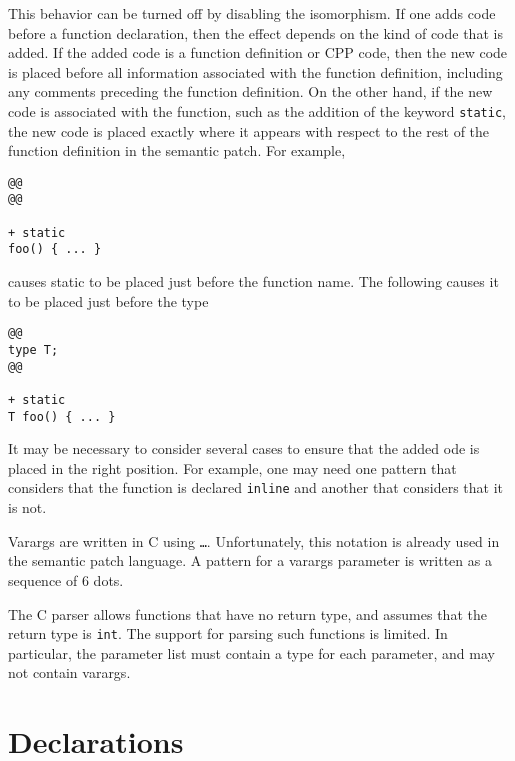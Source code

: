 \noindent
This behavior can be turned off by disabling the 
isomorphism.  If one adds code before a function declaration, then the
effect depends on the kind of code that is added.  If the added code is a
function definition or CPP code, then the new code is placed before
all information associated with the function definition, including any
comments preceding the function definition.  On the other hand, if the new
code is associated with the function, such as the addition of the keyword
{\tt static}, the new code is placed exactly where it appears with respect
to the rest of the function definition in the semantic patch.  For example,

\begin{lstlisting}[language=Cocci]
@@
@@

+ static
foo() { ... }
\end{lstlisting}

\noindent
causes static to be placed just before the function name.  The following
causes it to be placed just before the type

\begin{lstlisting}[language=Cocci]
@@
type T;
@@

+ static
T foo() { ... }
\end{lstlisting}

\noindent
It may be necessary to consider several cases to ensure that the added ode
is placed in the right position.  For example, one may need one pattern
that considers that the function is declared {\tt inline} and another that
considers that it is not.

Varargs are written in C using {\tt \ldots}.  Unfortunately, this notation
is already used in the semantic patch language.  A pattern for a varargs
parameter is written as a sequence of 6 dots.

The C parser allows functions that have no return type, and assumes that
the return type is \texttt{int}.  The support for parsing such functions is
limited.  In particular, the parameter list must contain a type for each
parameter, and may not contain varargs.


\section{Declarations}

